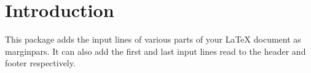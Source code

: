 \documentclass{scrartcl}
\begin{document}
\section{Introduction}
This package adds the input lines of various parts of your LaTeX
document as marginpars.
It can also add the first and last input lines read to the header and
footer respectively.
\end{document}
